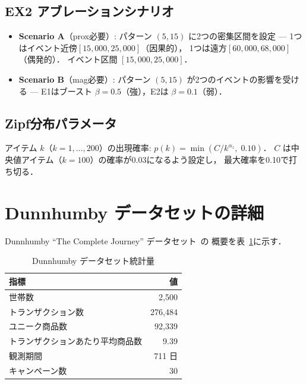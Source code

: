 \subsection{EX2 アブレーションシナリオ}

\begin{itemize}
\item \textbf{Scenario A}（prox必要）:
    パターン $(5,15)$ に2つの密集区間を設定 ---
    1つはイベント近傍$[15{,}000,25{,}000]$（因果的），
    1つは遠方$[60{,}000,68{,}000]$（偶発的）．
    イベント区間 $[15{,}000,25{,}000]$．
\item \textbf{Scenario B}（mag必要）:
    パターン $(5,15)$ が2つのイベントの影響を受ける ---
    E1はブースト $\beta = 0.5$（強），E2は $\beta = 0.1$（弱）．
\end{itemize}

\subsection{Zipf分布パラメータ}

アイテム $k$（$k = 1, \ldots, 200$）の出現確率:
$p(k) = \min(C / k^{\alpha_z},\; 0.10)$．
$C$ は中央値アイテム（$k=100$）の確率が0.03になるよう設定し，
最大確率を0.10で打ち切る．

\section{Dunnhumby データセットの詳細}\label{app:dunnhumby}

Dunnhumby ``The Complete Journey'' データセット~\cite{dunnhumby2014complete}の
概要を表~\ref{tab:dunnhumby_stats}に示す．

\begin{table}[t]
\caption{Dunnhumby データセット統計量}
\label{tab:dunnhumby_stats}
\centering
\begin{tabular}{lr}
\toprule
指標 & 値 \\
\midrule
世帯数 & 2{,}500 \\
トランザクション数 & 276{,}484 \\
ユニーク商品数 & 92{,}339 \\
トランザクションあたり平均商品数 & 9.39 \\
観測期間 & 711 日 \\
キャンペーン数 & 30 \\
\bottomrule
\end{tabular}
\end{table}

